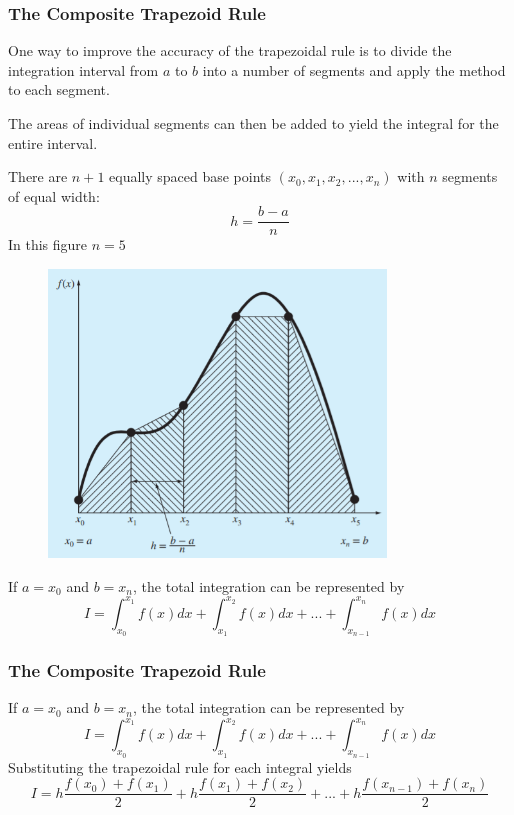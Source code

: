 \documentclass{if-beamer}
\begin{document}
\begin{frame}
	\frametitle{The Composite Trapezoid Rule}
	One way to improve the accuracy of the trapezoidal rule is to divide the integration interval from $a$ to $b$ into a number of segments and apply the method to each segment.\\\vspace{10pt}
	\begin{minipage}{0.5\textwidth}
		The areas of individual segments can then be added to yield the integral for the entire interval.\\\vspace{4pt}
		
		There are $n+1$ equally spaced base points $(x_0,x_1,x_2,...,x_n)$ with $n$ segments of equal width:
		$$h = \frac{b-a}{n}$$
		In this figure $n = 5$ \\\vspace{4pt}
	\end{minipage}
	\begin{minipage}{0.5\textwidth}
		\begin{figure}
			\centering
			\includegraphics[width=0.8\textwidth]{figures/compositeTrap}
		\end{figure}
	\end{minipage}

If $a = x_0$ and $b=x_n$, the total integration can be represented by
$$ I = \int_{x_0}^{x_1}f(x)dx + \int_{x_1}^{x_2}f(x)dx + ... + \int_{x_{n-1}}^{x_n}f(x)dx$$
\end{frame}

\begin{frame}
	\frametitle{The Composite Trapezoid Rule}
	If $a = x_0$ and $b=x_n$, the total integration can be represented by
	$$ I = \int_{x_0}^{x_1}f(x)dx + \int_{x_1}^{x_2}f(x)dx + ... + \int_{x_{n-1}}^{x_n}f(x)dx$$
	Substituting the trapezoidal rule for each integral yields
	$$I = h\frac{f(x_0)+f(x_1)}{2}+h\frac{f(x_1)+f(x_2)}{2}+...+h\frac{f(x_{n-1})+f(x_n)}{2}$$
\end{frame}
\end{document}
